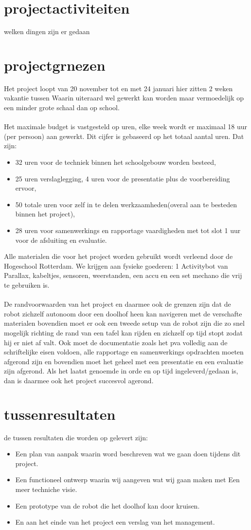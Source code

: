 \documentclass[oneside]{book}
\begin{document}
\chapter{projectactiviteiten}
welken dingen zijn er gedaan
\clearpage
\chapter{projectgrnezen}
Het project loopt van 20 november tot en met 24 januari hier zitten 2 weken vakantie tussen
Waarin uiteraard wel gewerkt kan worden maar vermoedelijk op een minder grote schaal dan op
school.\\
\\
Het maximale budget is vastgesteld op uren, elke week wordt er maximaal 18 uur (per persoon) aan
gewerkt.
Dit cijfer is gebaseerd op het totaal aantal uren.
Dat zijn: 
\begin{itemize}
\item 32 uren voor de techniek binnen het schoolgebouw worden besteed,
\item 25 uren verslaglegging, 4 uren voor de presentatie plus de voorbereiding ervoor,
\item 50 totale uren voor zelf in te delen werkzaamheden(overal aan te besteden binnen het project),
\item 28 uren voor samenwerkings en rapportage vaardigheden met tot slot 1 uur voor de afsluiting en
evaluatie.
\end{itemize}
Alle materialen die voor het project worden gebruikt wordt verleend door de Hogeschool
Rotterdam.
We krijgen aan fysieke goederen: 1 Activitybot van Parallax, kabeltjes, sensoren, weerstanden, een
accu en een set mechano die vrij te gebruiken is.\\
\\
De randvoorwaarden van het project en daarmee ook de grenzen zijn dat de robot zichzelf
autonoom door een doolhof heen kan navigeren met
de verschafte materialen bovendien moet er ook een tweede setup van de robot zijn die zo snel
mogelijk richting de rand van een tafel kan rijden en zichzelf op tijd stopt zodat hij er niet af valt.
Ook moet de documentatie zoals het pva volledig aan de schriftelijke eisen voldoen, alle rapportage
en samenwerkings opdrachten moeten
afgerond zijn en bovendien moet het geheel met een presentatie en een evaluatie zijn afgerond.
Als het laatst genoemde in orde en op tijd ingeleverd/gedaan is, dan is daarmee ook het project
succesvol agerond.
\clearpage
\chapter{tussenresultaten}
	de tussen resultaten die worden op gelevert zijn:
\begin{itemize}
	\item Een plan van aanpak waarin word beschreven wat we gaan doen tijdens dit project.
	\item Een functioneel ontwerp waarin wij aangeven wat wij gaan maken met Een meer techniche visie.
	\item Een prototype van de robot die het doolhof kan door kruisen.
	\item En aan het einde van het project een verslag van het management.
\end{itemize}
\clearpage
\end{document}
